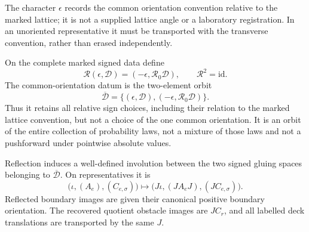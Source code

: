 The character \(\epsilon\) records the common orientation convention relative
to the marked lattice; it is not a supplied lattice angle or a laboratory
registration.  In an unoriented representative it must be transported with
the transverse convention, rather than erased independently.

\begin{definition}
\label{def:v28-common-orientation-datum}
On the complete marked signed data define
\begin{equation}\label{eq:v28-common-involution}
 \mathscr R(\epsilon,\mathscr D)
   =(-\epsilon,\mathscr R_0\mathscr D),
 \qquad \mathscr R^2=\mathrm{id}.
\end{equation}
The common-orientation datum is the two-element orbit
\[
 \overline{\mathscr D}
   =\{(\epsilon,\mathscr D),
             (-\epsilon,\mathscr R_0\mathscr D)\}.
\]
Thus it retains all relative sign choices, including their relation to the
marked lattice convention, but not a choice of the one common orientation.
It is an orbit of the entire collection of probability laws, not a mixture
of those laws and not a pushforward under pointwise absolute values.
\end{definition}

\begin{lemma}
\label{lem:v28-reflection-equivariance}
Reflection induces a well-defined involution between the two signed gluing
spaces belonging to \(\overline{\mathscr D}\).  On representatives it is
\begin{equation}\label{eq:v28-reflected-gluing}
 \bigl(\iota,(A_e),(C_{e,\sigma})\bigr)
 \longmapsto
 \bigl(J\iota,(JA_eJ),(JC_{e,\sigma})\bigr).
\end{equation}
Reflected boundary images are given their canonical positive boundary
orientation.  The recovered quotient obstacle images are \(JC_r\), and all
labelled deck translations are transported by the same \(J\).
\end{lemma}

